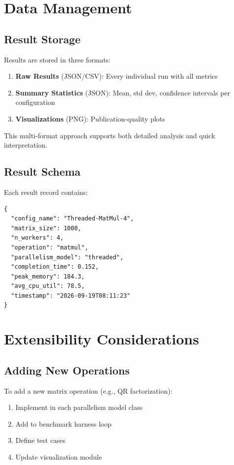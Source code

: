 \section{Data Management}

\subsection{Result Storage}

Results are stored in three formats:

\begin{enumerate}
    \item \textbf{Raw Results} (JSON/CSV): Every individual run with all metrics
    \item \textbf{Summary Statistics} (JSON): Mean, std dev, confidence intervals per configuration
    \item \textbf{Visualizations} (PNG): Publication-quality plots
\end{enumerate}

This multi-format approach supports both detailed analysis and quick interpretation.

\subsection{Result Schema}

Each result record contains:

\begin{verbatim}
{
  "config_name": "Threaded-MatMul-4",
  "matrix_size": 1000,
  "n_workers": 4,
  "operation": "matmul",
  "parallelism_model": "threaded",
  "completion_time": 0.152,
  "peak_memory": 184.3,
  "avg_cpu_util": 78.5,
  "timestamp": "2026-09-19T08:11:23"
}
\end{verbatim}

\section{Extensibility Considerations}

\subsection{Adding New Operations}

To add a new matrix operation (e.g., QR factorization):

\begin{enumerate}
    \item Implement in each parallelism model class
    \item Add to benchmark harness loop
    \item Define test cases
    \item Update visualization module
\end{enumerate}

